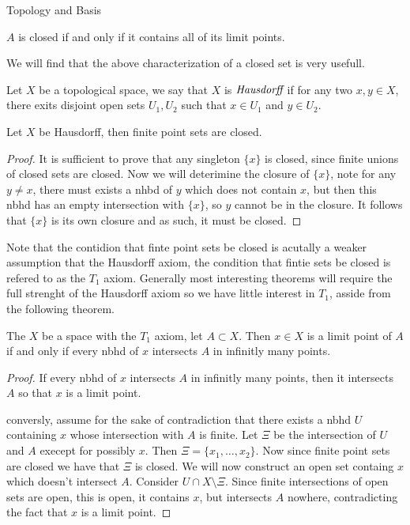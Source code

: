 \begin{chapter}{Topology and Basis}
   \begin{cor}
    $A$ is closed if and only if it contains all of its limit points. 
   \end{cor}

   We will find that the above characterization of a closed set is very usefull. 

   \begin{defn}
    Let $X$ be a topological space, we say that $X$ is $\emph{Hausdorff}$ if for any two $x, y \in X$, there exits disjoint
    open sets $U_1, U_2$ such that $x \in U_1 $ and $y \in U_2$. 
   \end{defn}


   \begin{thm}
    Let $X$ be Hausdorff, then finite point sets are closed. 
   \end{thm}

   \begin{proof}
    It is sufficient to prove that any singleton $\{x\}$ is closed, since finite unions of closed sets are closed. 
    Now we will deterimine the closure of $\{x\}$, note for any $y \neq x$, there must exists a nhbd of $y$ which does not contain $x$, 
    but then this nbhd has an empty intersection with $\{x\}$, so $y$ cannot be in the closure. It follows that $\{x\}$ is its own closure and as such, 
    it must be closed. 
   \end{proof}

   Note that the contidion that finte point sets be closed is acutally a weaker assumption that the Hausdorff axiom, the condition that fintie sets be closed is refered to as the $T_1$ axiom. 
   Generally most interesting theorems will require the full strenght of the Hausdorff axiom so we have little interest in $T_1$, asside from the following theorem. 


   \begin{thm}
    The $X$ be a space with the $T_1$ axiom, let $A \subset X$. Then $x \in X$ is a limit point of $A$ if and only if every nbhd of $x$ intersects $A$ in 
    infinitly many points. 
   \end{thm}

   \begin{proof}
    If every nbhd of $x$ intersects $A$ in infinitly many points, then it intersects $A$ so that $x$ is a limit point. 

    conversly, assume for the sake of contradiction that there exists a nbhd $U$ containing $x$ whose intersection with $A$ is finite. 
    Let $\Xi$ be the intersection of $U$ and $A$ execept for possibly $x$. Then $\Xi = \{x_1, \dots, x_2\}$. Now since finite point sets are closed we have that $\Xi$ is closed. 
    We will now construct an open set containg $x$ which doesn't intersect $A$. Consider $U \cap X \setminus \Xi$. Since finite intersections of open sets are open, this is open, 
    it contains $x$, but intersects $A$ nowhere, contradicting the fact that $x$ is a limit point. 
   \end{proof}


\end{chapter}
